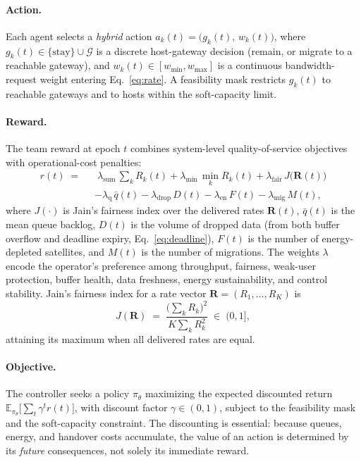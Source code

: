 \documentclass[11pt]{article}
\begin{document}
\paragraph{Action.} Each agent selects a \emph{hybrid} action
$a_k(t) = \big(g_k(t),\, w_k(t)\big)$, where $g_k(t) \in \{\text{stay}\} \cup
\mathcal{G}$ is a discrete host-gateway decision (remain, or migrate to a
reachable gateway), and $w_k(t) \in [w_{\min}, w_{\max}]$ is a continuous
bandwidth-request weight entering Eq.~\eqref{eq:rate}. A feasibility mask restricts
$g_k(t)$ to reachable gateways and to hosts within the soft-capacity limit.

\paragraph{Reward.} The team reward at epoch $t$ combines system-level
quality-of-service objectives with operational-cost penalties:
\begin{align}
  r(t) \;=\;\;
    &\; \lambda_{\mathrm{sum}}\, \textstyle\sum_{k} R_k(t)
     + \lambda_{\mathrm{min}}\, \min_{k} R_k(t)
     + \lambda_{\mathrm{fair}}\, J\big(\bm{R}(t)\big) \nonumber \\
    &- \lambda_{\mathrm{q}}\, \bar{q}(t)
     - \lambda_{\mathrm{drop}}\, D(t)
     - \lambda_{\mathrm{en}}\, F(t)
     - \lambda_{\mathrm{mig}}\, M(t),
  \label{eq:reward}
\end{align}
where $J(\cdot)$ is Jain's fairness index over the delivered rates
$\bm{R}(t)$, $\bar{q}(t)$ is the mean queue backlog, $D(t)$ is the volume of
dropped data (from both buffer overflow and deadline expiry,
Eq.~\eqref{eq:deadline}), $F(t)$ is the number of energy-depleted satellites, and
$M(t)$ is the number of migrations. The weights $\lambda$ encode the operator's
preference among throughput, fairness, weak-user protection, buffer health, data
freshness, energy sustainability, and control stability. Jain's fairness index for a rate
vector $\bm{R} = (R_1,\dots,R_K)$ is
\begin{equation}
  J(\bm{R}) \;=\; \frac{\big(\sum_k R_k\big)^2}{K \sum_k R_k^2}\;\in\;(0,1],
\end{equation}
attaining its maximum when all delivered rates are equal.

\paragraph{Objective.} The controller seeks a policy $\pi_\theta$ maximizing the
expected discounted return $\mathbb{E}_{\pi_\theta}\big[\sum_{t} \gamma^t r(t)\big]$,
with discount factor $\gamma \in (0,1)$, subject to the feasibility mask and the
soft-capacity constraint. The discounting is essential: because queues, energy,
and handover costs accumulate, the value of an action is determined by its
\emph{future} consequences, not solely its immediate reward.
\end{document}
